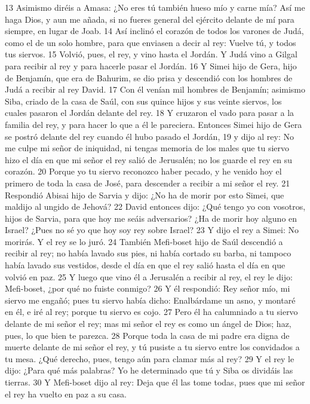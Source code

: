 13 Asimismo diréis a Amasa: ¿No eres tú también hueso mío y carne mía? Así me haga Dios, y aun me añada, si no fueres general del ejército delante de mí para siempre, en lugar de Joab.
14 Así inclinó el corazón de todos los varones de Judá, como el de un solo hombre, para que enviasen a decir al rey: Vuelve tú, y todos tus siervos.
15 Volvió, pues, el rey, y vino hasta el Jordán. Y Judá vino a Gilgal para recibir al rey y para hacerle pasar el Jordán.
16 Y Simei hijo de Gera, hijo de Benjamín, que era de Bahurim, se dio prisa y descendió con los hombres de Judá a recibir al rey David.
17 Con él venían mil hombres de Benjamín; asimismo Siba, criado de la casa de Saúl, con sus quince hijos y sus veinte siervos, los cuales pasaron el Jordán delante del rey.
18 Y cruzaron el vado para pasar a la familia del rey, y para hacer lo que a él le pareciera. Entonces Simei hijo de Gera se postró delante del rey cuando él hubo pasado el Jordán, 
19 y dijo al rey: No me culpe mi señor de iniquidad, ni tengas memoria de los males que tu siervo hizo el día en que mi señor el rey salió de Jerusalén; no los guarde el rey en su corazón.
20 Porque yo tu siervo reconozco haber pecado, y he venido hoy el primero de toda la casa de José, para descender a recibir a mi señor el rey.
21 Respondió Abisai hijo de Sarvia y dijo: ¿No ha de morir por esto Simei, que maldijo al ungido de Jehová?
22 David entonces dijo: ¿Qué tengo yo con vosotros, hijos de Sarvia, para que hoy me seáis adversarios? ¿Ha de morir hoy alguno en Israel? ¿Pues no sé yo que hoy soy rey sobre Israel?
23 Y dijo el rey a Simei: No morirás. Y el rey se lo juró.
24 También Mefi-boset hijo de Saúl descendió a recibir al rey; no había lavado sus pies, ni había cortado su barba, ni tampoco había lavado sus vestidos, desde el día en que el rey salió hasta el día en que volvió en paz.
25 Y luego que vino él a Jerusalén a recibir al rey, el rey le dijo: Mefi-boset, ¿por qué no fuiste conmigo?
26 Y él respondió: Rey señor mío, mi siervo me engañó; pues tu siervo había dicho: Enalbárdame un asno, y montaré en él, e iré al rey; porque tu siervo es cojo.
27 Pero él ha calumniado a tu siervo delante de mi señor el rey; mas mi señor el rey es como un ángel de Dios; haz, pues, lo que bien te parezca.
28 Porque toda la casa de mi padre era digna de muerte delante de mi señor el rey, y tú pusiste a tu siervo entre los convidados a tu mesa. ¿Qué derecho, pues, tengo aún para clamar más al rey?
29 Y el rey le dijo: ¿Para qué más palabras? Yo he determinado que tú y Siba os dividáis las tierras.
30 Y Mefi-boset dijo al rey: Deja que él las tome todas, pues que mi señor el rey ha vuelto en paz a su casa.
